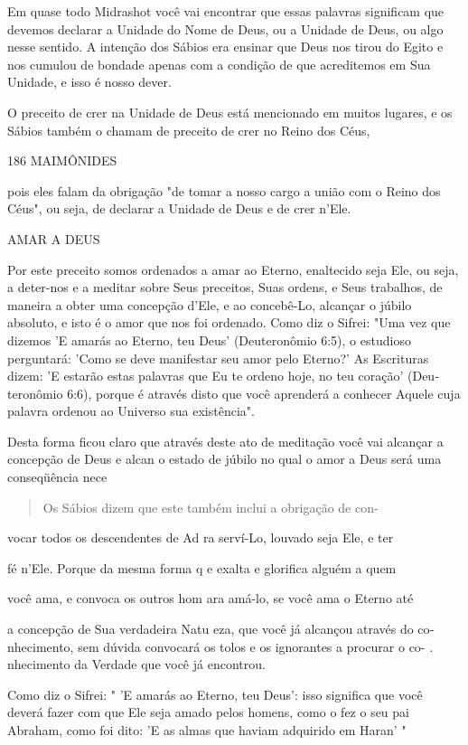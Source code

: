 Em quase todo Midrashot você vai encontrar que essas palavras
sig­nificam que devemos declarar a Unidade do Nome de Deus, ou a Unidade
de Deus, ou algo nesse sentido. A intenção dos Sábios era ensinar que
Deus nos tirou do Egito e nos cumulou de bondade apenas com a condição
de que acre­ditemos em Sua Unidade, e isso é nosso dever.

O preceito de crer na Unidade de Deus está mencionado em muitos lugares,
e os Sábios também o chamam de preceito de crer no Reino dos Céus,

186 MAIMÔNIDES

pois eles falam da obrigação "de tomar a nosso cargo a união com o Reino
dos Céus", ou seja, de declarar a Unidade de Deus e de crer n'Ele.

AMAR A DEUS

Por este preceito somos ordenados a amar ao Eterno, enaltecido se­ja
Ele, ou seja, a deter-nos e a meditar sobre Seus preceitos, Suas ordens,
e Seus trabalhos, de maneira a obter uma concepção d'Ele, e ao
concebê-Lo, alcançar o júbilo absoluto, e isto é o amor que nos foi
ordenado. Como diz o Sifrei: "Uma vez que dizemos 'E amarás ao Eterno,
teu Deus' (Deuteronômio 6:5), o estu­dioso perguntará: 'Como se deve
manifestar seu amor pelo Eterno?' As Escritu­ras dizem: 'E estarão estas
palavras que Eu te ordeno hoje, no teu coração' (Deu­teronômio 6:6),
porque é através disto que você aprenderá a conhecer Aquele cuja palavra
ordenou ao Universo sua existência".

Desta forma ficou claro que através deste ato de meditação você vai
alcançar a concepção de Deus e alcan o estado de júbilo no qual o amor a
Deus será uma conseqüência nece

\begin{quote}
Os Sábios dizem que este também inclui a obrigação de con-
\end{quote}

vocar todos os descendentes de Ad ra serví-Lo, louvado seja Ele, e ter

fé n'Ele. Porque da mesma forma q e exalta e glorifica alguém a quem

você ama, e convoca os outros hom ara amá-lo, se você ama o Eterno até

a concepção de Sua verdadeira Natu eza, que você já alcançou através do
co­nhecimento, sem dúvida convocará os tolos e os ignorantes a procurar
o co- . nhecimento da Verdade que você já encontrou.

Como diz o Sifrei: " 'E amarás ao Eterno, teu Deus': isso significa que
você deverá fazer com que Ele seja amado pelos homens, como o fez o seu
pai Abraham, como foi dito: 'E as almas que haviam adquirido em Haran' "


